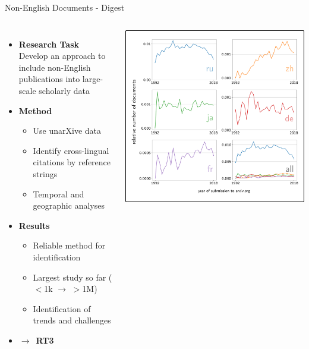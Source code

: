 \documentclass[en,16:9,smallfoot]{sdqbeamer}
\newcommand{\rtmark}[1]{%
    \textbf{{\color{objblue-box}\faCrosshairs}\,RT#1}%
}
\begin{document}
   \begin{frame}{Non-English Documents - Digest}

   \begin{columns}
        \vspace{-1cm}
        \begin{itemize}
            \item \textbf{Research Task}\\Develop an approach to include non-English publications into large-scale scholarly data
            \item \textbf{Method}
            \begin{itemize}
                \item Use unarXive data
                \item Identify cross-lingual citations by reference strings
                \item Temporal and geographic analyses
            \end{itemize}
            \item \textbf{Results}
            \begin{itemize}
                \item Reliable method for identification
                \item Largest study so far ($<$1k $\rightarrow$ $>$1M)
                \item Identification of trends and challenges
            \end{itemize}
            \item $\rightarrow$ \rtmark{3\large\checkmark}
        \end{itemize}
            \includegraphics[width=0.8\linewidth]{imgs/xling_example_result}

\end{columns}
\end{frame}
\end{document}
